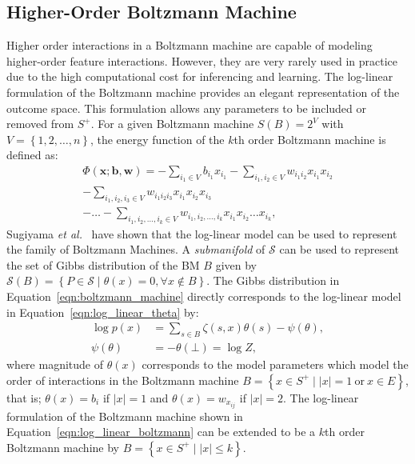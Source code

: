 \documentclass[letterpaper]{article} %
\begin{document}
	\subsection{Higher-Order Boltzmann Machine}
		Higher order interactions in a Boltzmann machine are capable of modeling higher-order feature interactions. However, they are very rarely used in practice due to the high computational cost for inferencing and learning. The log-linear formulation of the Boltzmann machine provides an elegant representation of the outcome space. This formulation allows any parameters to be included or removed from $S^{+}$. For a given Boltzmann machine $S(B) = 2^{V}$ with $V = \left\{ 1, 2, \ldots, n \right\}$, the energy function of the $k$th order Boltzmann machine is defined as:
		\begin{multline*}
			\Phi \left( \mathbf{x}; \mathbf{b}, \mathbf{w} \right) = -\sum_{{i_1} \in V} b_{{i_1}} x_{{i_1}} - \sum_{{i_1},{i_2} \in V} w_{{i_1}{i_2}} x_{i_1} x_{i_2} \\
			- \sum_{i_1,i_2,i_3 \in V} w_{{i_1}{i_2}{i_3}} x_{i_1} x_{i_2} x_{i_3} \\
			- \dots - \sum_{{i_1},{i_2},\ldots,{i_k} \in V} w_{{i_1}, {i_2}, \ldots, {i_k}} x_{i_1} x_{i_2} \ldots x_{i_k},
		\end{multline*}
		Sugiyama \textit{et al.}~\cite{sugiyama2016information,sugiyama2017tensor} have shown that the log-linear model can be used to represent the family of Boltzmann Machines. A \textit{submanifold} of $\mathcal{S}$ can be used to represent the set of Gibbs distribution of the BM $B$ given by $\mathcal{S} \left( B \right) = \left\{ P \in \mathcal{S} \mid \theta \left( x \right) = 0, \forall x \notin B \right\}$. The Gibbs distribution in Equation~\eqref{eqn:boltzmann_machine} directly corresponds to the log-linear model in Equation~\eqref{eqn:log_linear_theta} by:
		\begin{equation}
			\begin{split}
			\log p \left( x \right) &= \sum_{s \in B} \zeta \left( s, x \right) \theta \left( s \right) - \psi \left( \theta \right), \\
			\psi \left( \theta \right) &= - \theta \left( \bot \right) = \log Z, \label{eqn:log_linear_boltzmann}
			\end{split}
		\end{equation}
		where magnitude of $\theta \left( x \right)$ corresponds to the model parameters which model the order of interactions in the Boltzmann machine $B = \left\{ x \in S^{+} \mid \left| x \right| = 1 \mathrm{\ or\ } x \in E \right\}$, that is; $\theta \left( x \right) = b_i$ if $| x | = 1$ and $\theta \left( x \right) = w_{x_{ij}}$ if $\left| x \right| = 2$. The log-linear formulation of the Boltzmann machine shown in Equation~\eqref{eqn:log_linear_boltzmann} can be extended to be a $k$th order Boltzmann machine by $B = \left\{ x \in S^{+} \mid \left| x \right| \le k \right\}$.
\end{document}
